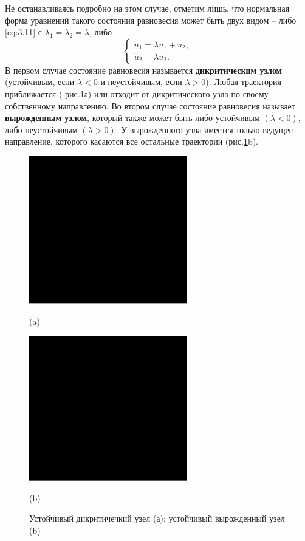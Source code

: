  Не останавливаясь подробно на этом случае, отметим лишь, что нормальная форма уравнений такого состояния равновесия может быть двух видом -- либо \eqref{eq:3.11} с $\lambda_1=\lambda_2=\lambda$, либо 
 \begin{equation}
         \label{eq:3.24}
         \begin{cases}
                 \dot u_1 = \lambda u_1 + u_2, \\
                 \dot u_2= \lambda u_2.
         \end{cases}
 \end{equation}
 В первом случае состояние равновесия называется \textbf{ дикритическим узлом} 
 (устойчивым, если $\lambda<0$ и неустойчивым, если $\lambda>0$). Любая траектория приближается ( рис.\ref{fig:3.6}а) или отходит от дикритического узла по своему собственному направлению. Во втором случае состояние равновесия  
 называет \textbf{ вырожденным узлом}, который также может быть либо устойчивым $(\lambda<0)$, либо неустойчивым $(\lambda>0)$. У вырожденного узла имеется только ведущее направление, которого касаются все остальные траектории (рис.\ref{fig:3.6}b).

 \begin{figure}[h!]
        \centering
        \begin{minipage}{0.45\linewidth}
                \centering  
                \includegraphics[]{fig/lect3/6a}

                (a)
        \end{minipage}
        \begin{minipage}{0.45\linewidth}
                \centering  
                \includegraphics[]{fig/lect3/6b}

                (b)
        \end{minipage}
         \label{fig:3.6}
         \caption{Устойчивый дикритичечкий узел (а); устойчивый вырожденный узел (b)}
 \end{figure}
 
